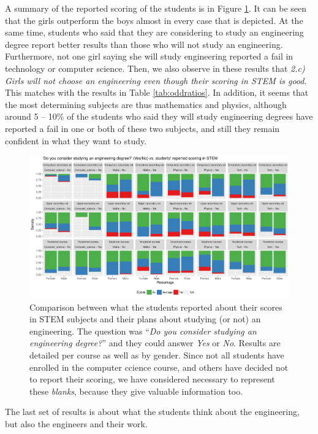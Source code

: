 \documentclass[journal,transmag]{IEEEtran}
\begin{document}
A summary of the reported scoring of the students is in Figure \ref{fig:futurevsscore}. It can be seen that the girls outperform the boys almost in every case that is depicted. At the same time, students who said that they are considering to study an engineering degree report better results than those who will not study an engineering. Furthermore, not one girl saying she will study engineering reported a fail in technology or computer science. Then, we also observe in these results that \textit{2.c) Girls will not choose an engineering even though their scoring in STEM is good}. This matches with the results in Table \ref{tab:oddratios}. In addition, it seems that the most determining subjects are thus mathematics and physics, although around 5 -- 10\% of the students who said they will study engineering degrees have reported a fail in one or both of these two subjects, and still they remain confident in what they want to study.

\begin{figure}
	\centering
	\includegraphics[width=1\textwidth]{img/future_vs_scoringSTEM.pdf}
	\caption{Comparison between what the students reported about their scores in STEM subjects and their plans about studying (or not) an engineering. The question was ``\textit{Do you consider studying an engineering degree?}'' and they could answer \textit{Yes} or \textit{No}. Results are detailed per course as well as by gender. Since not all students have enrolled in the computer ccience course, and others have decided not to report their scoring, we have considered necessary to represent these \textit{blanks}, because they give valuable information too.}
	\label{fig:futurevsscore}
\end{figure}

The last set of results is about what the students think about the engineering, but also the engineers and their work. 
\end{document}
